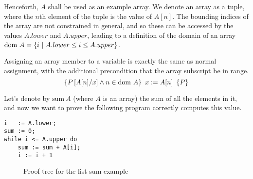 Henceforth, $A$ shall be used as an example array. We denote an array
as a tuple, where the $n$th element of the tuple is the value of
$A[n]$. The bounding indices of the array are not constrained in
general, and so these can be accessed by the values $A.lower$ and
$A.upper$, leading to a definition of the domain of an array $\dom~A =
\{i~|~A.lower \leq i \leq A.upper\}$.

\begin{definition}
  Assigning an array member to a variable is exactly the same as
  normal assignment, with the additional precondition that the array
  subscript be in range.
  \[\htriplem{P\left[A[n]/x\right] \land n \in \dom~A}{x := A[n]}{P}\]
\end{definition}

\begin{example}
  \label{exmpl:heap-sum}
  
  Let's denote by $\mathrm{sum}~A$ (where $A$ is an array) the sum of
  all the elements in it, and now we want to prove the following
  program correctly computes this value.

\begin{lstlisting}
i   := A.lower;
sum := 0;
while i <= A.upper do
    sum := sum + A[i];
    i := i + 1
\end{lstlisting}

  \begin{figure}[t]
    \centering
      \begin{prooftree}




      \end{prooftree}
    \caption{Proof tree for the list sum example}
    \label{fig:exmpl:heap-sum-tree}
  \end{figure}


\end{example}
